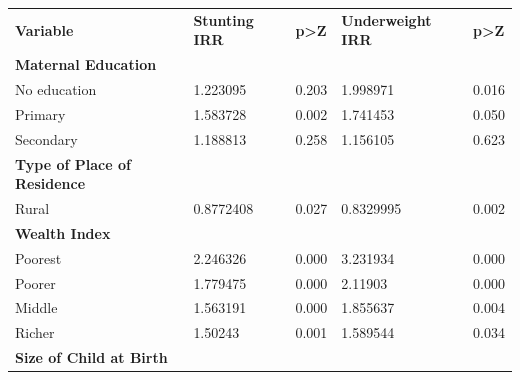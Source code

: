 	\begin{frame}
		\begin{table}[]
			\begin{tabular}{lllll}
				\textbf{Variable}                   & \textbf{Stunting IRR} & \textbf{p\textgreater{}Z} & \textbf{Underweight IRR} & \textbf{p\textgreater{}Z} \\
				\textbf{Maternal Education}         &                       &                           &                          &                           \\
				No education                        & 1.223095              & 0.203                     & 1.998971                 & 0.016                     \\
				Primary                             & 1.583728              & 0.002                     & 1.741453                 & 0.050                     \\
				Secondary                           & 1.188813              & 0.258                     & 1.156105                 & 0.623                     \\
				\textbf{Type of Place of Residence} &                       &                           &                          &                           \\
				Rural                               & 0.8772408             & 0.027                     & 0.8329995                & 0.002                     \\
				\textbf{Wealth Index}               &                       &                           &                          &                           \\
				Poorest                             & 2.246326              & 0.000                     & 3.231934                 & 0.000                     \\
				Poorer                              & 1.779475              & 0.000                     & 2.11903                  & 0.000                     \\
				Middle                              & 1.563191              & 0.000                     & 1.855637                 & 0.004                     \\
				Richer                              & 1.50243               & 0.001                     & 1.589544                 & 0.034                     \\
				\textbf{Size of Child at Birth}     &                       &                           &                          &                           \\

\end{tabular}
\end{table}
\end{frame}
